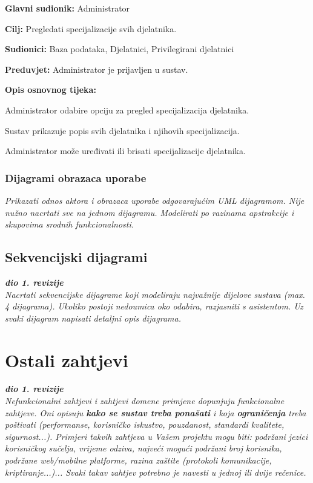 	\item \textbf{Glavni sudionik:} Administrator
	\item \textbf{Cilj:} Pregledati specijalizacije svih djelatnika.
	\item \textbf{Sudionici:} Baza podataka, Djelatnici, Privilegirani djelatnici
	\item \textbf{Preduvjet:} Administrator je prijavljen u sustav.
	\item \textbf{Opis osnovnog tijeka:}
	\begin{packed_enum}
		\item Administrator odabire opciju za pregled specijalizacija djelatnika.
		\item Sustav prikazuje popis svih djelatnika i njihovih specijalizacija.
		\item Administrator može uređivati ili brisati specijalizacije djelatnika.
	\end{packed_enum}
\closeusecase


\subsubsection{Dijagrami obrazaca uporabe}

\textit{Prikazati odnos aktora i obrazaca uporabe odgovarajućim UML dijagramom. Nije nužno nacrtati sve na jednom dijagramu. Modelirati po razinama apstrakcije i skupovima srodnih funkcionalnosti.}
\eject

\subsection{Sekvencijski dijagrami}

\textbf{\textit{dio 1. revizije}}\\

\textit{Nacrtati sekvencijske dijagrame koji modeliraju najvažnije dijelove sustava (max. 4 dijagrama). Ukoliko postoji nedoumica oko odabira, razjasniti s asistentom. Uz svaki dijagram napisati detaljni opis dijagrama.}
\eject

\section{Ostali zahtjevi}

\textbf{\textit{dio 1. revizije}}\\

\textit{Nefunkcionalni zahtjevi i zahtjevi domene primjene dopunjuju funkcionalne zahtjeve. Oni opisuju \textbf{kako se sustav treba ponašati} i koja \textbf{ograničenja} treba poštivati (performanse, korisničko iskustvo, pouzdanost, standardi kvalitete, sigurnost...). Primjeri takvih zahtjeva u Vašem projektu mogu biti: podržani jezici korisničkog sučelja, vrijeme odziva, najveći mogući podržani broj korisnika, podržane web/mobilne platforme, razina zaštite (protokoli komunikacije, kriptiranje...)... Svaki takav zahtjev potrebno je navesti u jednoj ili dvije rečenice.}
			 
			 
			 
	
